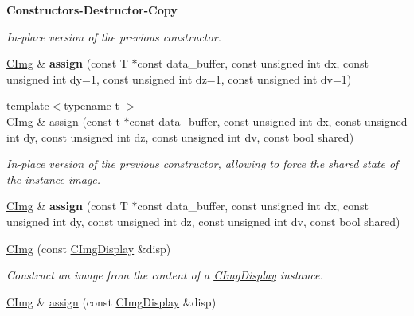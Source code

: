\begin{Indent}{\bf Constructors-\/\-Destructor-\/\-Copy}
\begin{DoxyCompactItemize}
\begin{DoxyCompactList}\small\item\em In-\/place version of the previous constructor. \end{DoxyCompactList}\item 
\hypertarget{structcimg__library_1_1_c_img_a7a57402bd4c7d8e4f369d911e6298f97}{\hyperlink{structcimg__library_1_1_c_img}{C\-Img} \& {\bfseries assign} (const T $\ast$const data\-\_\-buffer, const unsigned int dx, const unsigned int dy=1, const unsigned int dz=1, const unsigned int dv=1)}\label{structcimg__library_1_1_c_img_a7a57402bd4c7d8e4f369d911e6298f97}

\item 
\hypertarget{structcimg__library_1_1_c_img_aa448a1380e9de5efbc421599e4fc59f9}{{\footnotesize template$<$typename t $>$ }\\\hyperlink{structcimg__library_1_1_c_img}{C\-Img} \& \hyperlink{structcimg__library_1_1_c_img_aa448a1380e9de5efbc421599e4fc59f9}{assign} (const t $\ast$const data\-\_\-buffer, const unsigned int dx, const unsigned int dy, const unsigned int dz, const unsigned int dv, const bool shared)}\label{structcimg__library_1_1_c_img_aa448a1380e9de5efbc421599e4fc59f9}

\begin{DoxyCompactList}\small\item\em In-\/place version of the previous constructor, allowing to force the shared state of the instance image. \end{DoxyCompactList}\item 
\hypertarget{structcimg__library_1_1_c_img_a61d062909d722312dd86c40cea4750cc}{\hyperlink{structcimg__library_1_1_c_img}{C\-Img} \& {\bfseries assign} (const T $\ast$const data\-\_\-buffer, const unsigned int dx, const unsigned int dy, const unsigned int dz, const unsigned int dv, const bool shared)}\label{structcimg__library_1_1_c_img_a61d062909d722312dd86c40cea4750cc}

\item 
\hypertarget{structcimg__library_1_1_c_img_ab2cba8b4a8be8a65ad07e0b48af67131}{\hyperlink{structcimg__library_1_1_c_img_ab2cba8b4a8be8a65ad07e0b48af67131}{C\-Img} (const \hyperlink{structcimg__library_1_1_c_img_display}{C\-Img\-Display} \&disp)}\label{structcimg__library_1_1_c_img_ab2cba8b4a8be8a65ad07e0b48af67131}

\begin{DoxyCompactList}\small\item\em Construct an image from the content of a \hyperlink{structcimg__library_1_1_c_img_display}{C\-Img\-Display} instance. \end{DoxyCompactList}\item 
\hypertarget{structcimg__library_1_1_c_img_afc73889d32581e3c839a752b40c62548}{\hyperlink{structcimg__library_1_1_c_img}{C\-Img} \& \hyperlink{structcimg__library_1_1_c_img_afc73889d32581e3c839a752b40c62548}{assign} (const \hyperlink{structcimg__library_1_1_c_img_display}{C\-Img\-Display} \&disp)}\label{structcimg__library_1_1_c_img_afc73889d32581e3c839a752b40c62548}


\end{DoxyCompactItemize}
\end{Indent}
